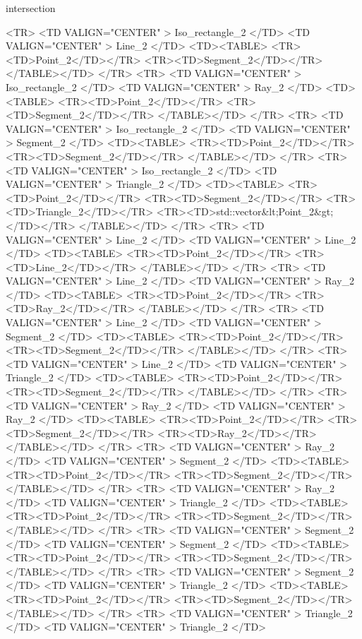 \begin{ccRefFunction}{intersection}
\begin{ccHtmlOnly}
<TR>
    <TD VALIGN="CENTER" > Iso_rectangle_2 </TD>
    <TD VALIGN="CENTER" > Line_2 </TD>
    <TD><TABLE>
	<TR><TD>Point_2</TD></TR>
	<TR><TD>Segment_2</TD></TR>
      </TABLE></TD>
</TR>
<TR>
    <TD VALIGN="CENTER" > Iso_rectangle_2 </TD>
    <TD VALIGN="CENTER" > Ray_2 </TD>
    <TD><TABLE>
	<TR><TD>Point_2</TD></TR>
	<TR><TD>Segment_2</TD></TR>
      </TABLE></TD>
</TR>
<TR>
    <TD VALIGN="CENTER" > Iso_rectangle_2 </TD>
    <TD VALIGN="CENTER" > Segment_2 </TD>
    <TD><TABLE>
	<TR><TD>Point_2</TD></TR>
	<TR><TD>Segment_2</TD></TR>
      </TABLE></TD>
</TR>
<TR>
    <TD VALIGN="CENTER" > Iso_rectangle_2 </TD>
    <TD VALIGN="CENTER" > Triangle_2 </TD>
    <TD><TABLE>
	<TR><TD>Point_2</TD></TR>
	<TR><TD>Segment_2</TD></TR>
	<TR><TD>Triangle_2</TD></TR>
  <TR><TD>std::vector&lt;Point_2&gt;</TD></TR>
      </TABLE></TD>
</TR>
<TR>
    <TD VALIGN="CENTER" > Line_2 </TD>
    <TD VALIGN="CENTER" > Line_2 </TD>
    <TD><TABLE>
	<TR><TD>Point_2</TD></TR>
	<TR><TD>Line_2</TD></TR>
        </TABLE></TD>
</TR>
<TR>
    <TD VALIGN="CENTER" > Line_2 </TD>
    <TD VALIGN="CENTER" > Ray_2 </TD>
    <TD><TABLE>
	<TR><TD>Point_2</TD></TR>
	<TR><TD>Ray_2</TD></TR>
      </TABLE></TD>
</TR>
<TR>
    <TD VALIGN="CENTER" > Line_2 </TD>
    <TD VALIGN="CENTER" > Segment_2 </TD>
    <TD><TABLE>
	<TR><TD>Point_2</TD></TR>
	<TR><TD>Segment_2</TD></TR>
      </TABLE></TD>
</TR>
<TR>
    <TD VALIGN="CENTER" > Line_2 </TD>
    <TD VALIGN="CENTER" > Triangle_2 </TD>
    <TD><TABLE>
	<TR><TD>Point_2</TD></TR>
	<TR><TD>Segment_2</TD></TR>
      </TABLE></TD>
</TR>
<TR>
    <TD VALIGN="CENTER" > Ray_2 </TD>
    <TD VALIGN="CENTER" > Ray_2 </TD>
    <TD><TABLE>
	<TR><TD>Point_2</TD></TR>
	<TR><TD>Segment_2</TD></TR>
	<TR><TD>Ray_2</TD></TR>
      </TABLE></TD>
</TR>
<TR>
    <TD VALIGN="CENTER" > Ray_2 </TD>
    <TD VALIGN="CENTER" > Segment_2 </TD>
    <TD><TABLE>
	<TR><TD>Point_2</TD></TR>
	<TR><TD>Segment_2</TD></TR>
      </TABLE></TD>
</TR>
<TR>
    <TD VALIGN="CENTER" > Ray_2 </TD>
    <TD VALIGN="CENTER" > Triangle_2 </TD>
    <TD><TABLE>
	<TR><TD>Point_2</TD></TR>
	<TR><TD>Segment_2</TD></TR>
      </TABLE></TD>
</TR>
<TR>
    <TD VALIGN="CENTER" > Segment_2 </TD>
    <TD VALIGN="CENTER" > Segment_2 </TD>
    <TD><TABLE>
	<TR><TD>Point_2</TD></TR>
	<TR><TD>Segment_2</TD></TR>
      </TABLE></TD>
</TR>
<TR>
    <TD VALIGN="CENTER" > Segment_2 </TD>
    <TD VALIGN="CENTER" > Triangle_2 </TD>
    <TD><TABLE>
	<TR><TD>Point_2</TD></TR>
	<TR><TD>Segment_2</TD></TR>
      </TABLE></TD>
</TR>
<TR>
    <TD VALIGN="CENTER" > Triangle_2 </TD>
    <TD VALIGN="CENTER" > Triangle_2 </TD>

\end{ccHtmlOnly}
\end{ccRefFunction}

